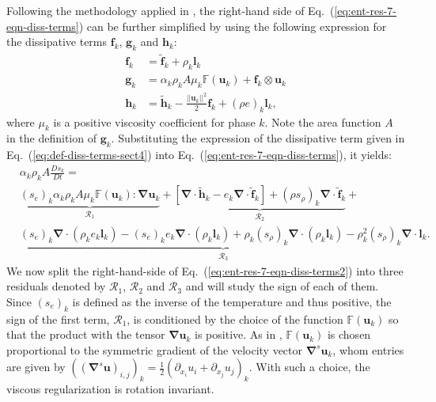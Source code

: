 \documentclass[preprint,10pt]{elsarticle}
\renewcommand{\div}{\mbold{\nabla}\! \cdot \!}
\newcommand{\grad}{\mbold{\nabla}}
\newcommand{\mbold}[1]{\boldsymbol#1}
\newcommand{\eqt}[1]{Eq.~(\ref{#1})}                     %
\begin{document}
Following the methodology applied in \cite{jlg, Marco_paper_low_mach}, the right-hand side of \eqt{eq:ent-res-7-eqn-diss-terms} can be further simplified by using the following expression
for the dissipative terms $\mbold f_k$,  $\mbold g_k$ and $\mbold h_k$:
%
\begin{subequations}\label{eq:def-diss-terms-sect4}
\begin{align}
  \mbold f_k &= \tilde{\mbold f}_k + \rho_k \mbold  l_k 
  \\
  \mbold g_k &= \alpha_k \rho_k A \mu_k \mathbb{F}(\mbold u_k) + \mbold f_k \otimes \mbold u_k
  \\
  \mbold h_k &= \tilde{\mbold h}_k - \frac{|| \mbold u_k||^2 }{2} \mbold f_k + (\rho e)_k \mbold l_k,
\end{align}
\end{subequations}
%
where $\mu_k$ is a positive viscosity coefficient for phase $k$. Note the area function $A$ in the definition of $\mbold g_k$. Substituting the expression of the dissipative term given in \eqt{eq:def-diss-terms-sect4} into \eqt{eq:ent-res-7-eqn-diss-terms}, it yields:
%
\begin{align}\label{eq:ent-res-7-eqn-diss-terms2}
&\alpha_k \rho_k A \frac{Ds_k}{Dt} = \nonumber \\
&\underbrace{\left(s_e\right)_k \alpha_k \rho_k A \mu_k \mathbb{F}(\mbold u_k) : \grad \mbold u_k}_{\mathcal{R}_1} +
\underbrace{\left[ \div \tilde{\mbold h}_k  - e_k \div \tilde{\mbold f}_k  \right] + (\rho s_\rho)_k \div \tilde{\mbold f}_k}_{\mathcal{R}_2} + \nonumber \\
&\underbrace{(s_e)_k \div \left( \rho_k e_k \mbold l_k \right) -  (s_e)_k e_k \div \left( \rho_k \mbold l_k \right) + \rho_k (s_\rho)_k \div \left( \rho_k \mbold l_k \right) 
  - \rho_k^2 (s_\rho)_k \div \mbold l_k}_{\mathcal{R}_3}.
\end{align}
%
We now split the right-hand-side of \eqt{eq:ent-res-7-eqn-diss-terms2} into three residuals denoted by $\mathcal{R}_1$, $\mathcal{R}_2$ and $\mathcal{R}_3$ and will study the sign of each of them. Since $(s_e)_k$ is defined as the inverse of the temperature and thus positive, the sign of the first term, $\mathcal{R}_1$, is conditioned by the choice of the function $\mathbb{F}(\mbold u_k)$ so that the product with the tensor $\grad \mbold u_k$ is positive. As in \cite{jlg, Marco_paper_low_mach}, $\mathbb{F}(\mbold u_k)$ is chosen proportional to the symmetric gradient of the velocity vector $\grad^s \mbold u_k$, whom entries are given by $\left( (\grad^s \mbold u)_{i,j} \right)_k = \frac{1}{2} \left( \partial_{x_i} u_i + \partial_{x_j} u_j \right)_k$. With such a choice, the viscous regularization is rotation invariant.
\end{document}
